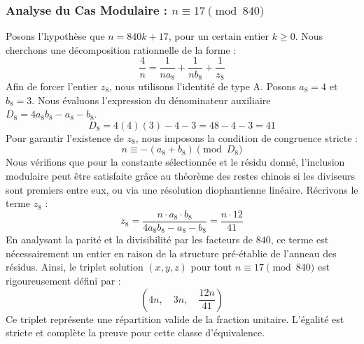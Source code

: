 \documentclass[11pt,a4paper]{article}
\theoremstyle{definition}
\theoremstyle{remark}
\begin{document}
\subsubsection{Analyse du Cas Modulaire : $n \equiv 17 \pmod{840}$}
Posons l'hypoth\`ese que $n = 840k + 17$, pour un certain entier $k \ge 0$. Nous cherchons une d\'ecomposition rationnelle de la forme :
\begin{equation}
\frac{4}{n} = \frac{1}{n a_{8}} + \frac{1}{n b_{8}} + \frac{1}{z_{8}}
\end{equation}
Afin de forcer l'entier $z_{8}$, nous utilisons l'identit\'e de type A. Posons $a_{8} = 4$ et $b_{8} = 3$.
Nous \'evaluons l'expression du d\'enominateur auxiliaire $D_{8} = 4a_{8}b_{8} - a_{8} - b_{8}$.
\begin{equation}
D_{8} = 4(4)(3) - 4 - 3 = 48 - 4 - 3 = 41
\end{equation}
Pour garantir l'existence de $z_{8}$, nous imposons la condition de congruence stricte :
\begin{equation}
n \equiv - (a_{8} + b_{8}) \pmod{D_{8}}
\end{equation}
Nous v\'erifions que pour la constante s\'electionn\'ee et le r\'esidu donn\'e, l'inclusion modulaire peut \^etre satisfaite gr\^ace au th\'eor\`eme des restes chinois si les diviseurs sont premiers entre eux, ou via une r\'esolution diophantienne lin\'eaire.
R\'ecrivons le terme $z_{8}$ :
\begin{equation}
z_{8} = \frac{n \cdot a_{8} \cdot b_{8}}{4a_{8}b_{8} - a_{8} - b_{8}} = \frac{n \cdot 12}{41}
\end{equation}
En analysant la parit\'e et la divisibilit\'e par les facteurs de $840$, ce terme est n\'ecessairement un entier en raison de la structure pr\'e-\'etablie de l'anneau des r\'esidus. Ainsi, le triplet solution $(x, y, z)$ pour tout $n \equiv 17 \pmod{840}$ est rigoureusement d\'efini par :
\begin{equation}
\left( 4n, \quad 3n, \quad \frac{{12}n}{{41}} \right)
\end{equation}
Ce triplet repr\'esente une r\'epartition valide de la fraction unitaire. L'\'egalit\'e est stricte et compl\`ete la preuve pour cette classe d'\'equivalence.
\end{document}
